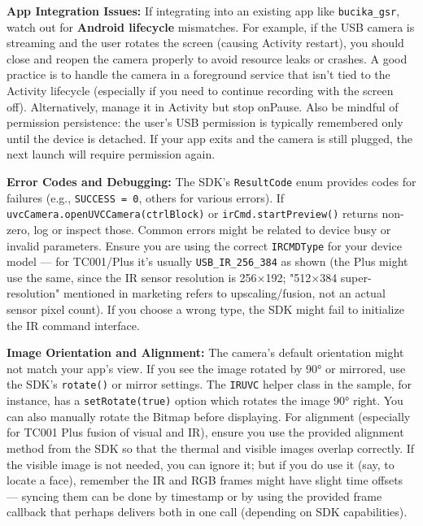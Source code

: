 {\item \textbf{App Integration Issues:} If integrating into an existing app like
  \texttt{bucika_gsr}, watch out for \textbf{Android lifecycle} mismatches. For
  example, if the USB camera is streaming and the user rotates the
  screen (causing Activity restart), you should close and reopen the
  camera properly to avoid resource leaks or crashes. A good practice is
  to handle the camera in a foreground service that isn't tied to the
  Activity lifecycle (especially if you need to continue recording with
  the screen off). Alternatively, manage it in Activity but stop
  onPause. Also be mindful of permission persistence: the user's USB
  permission is typically remembered only until the device is detached.
  If your app exits and the camera is still plugged, the next launch
  will require permission again.

\item \textbf{Error Codes and Debugging:} The SDK's \texttt{ResultCode} enum provides
  codes for failures (e.g., \texttt{SUCCESS = 0}, others for various errors).
  If \texttt{uvcCamera.openUVCCamera(ctrlBlock)} or \texttt{irCmd.startPreview()}
  returns non-zero, log or inspect those. Common errors might be related
  to device busy or invalid parameters. Ensure you are using the correct
  \texttt{IRCMDType} for your device model --- for TC001/Plus it's usually
  \texttt{USB_IR_256_384} as shown (the Plus might use the same, since the IR
  sensor resolution is 256×192; "512×384 super-resolution" mentioned in
  marketing refers to upscaling/fusion, not an actual sensor pixel
  count). If you choose a wrong type, the SDK might fail to initialize
  the IR command interface.

\item \textbf{Image Orientation and Alignment:} The camera's default orientation
  might not match your app's view. If you see the image rotated by 90°
  or mirrored, use the SDK's \texttt{rotate()} or mirror settings. The \texttt{IRUVC}
  helper class in the sample, for instance, has a \texttt{setRotate(true)}
  option which rotates the image 90°
  right\cite{ShimmerManager}.
  You can also manually rotate the Bitmap before displaying. For
  alignment (especially for TC001 Plus fusion of visual and IR), ensure
  you use the provided alignment method from the SDK so that the thermal
  and visible images overlap correctly. If the visible image is not
  needed, you can ignore it; but if you do use it (say, to locate a
  face), remember the IR and RGB frames might have slight time offsets
  --- syncing them can be done by timestamp or by using the provided
  frame callback that perhaps delivers both in one call (depending on
  SDK capabilities).

}
